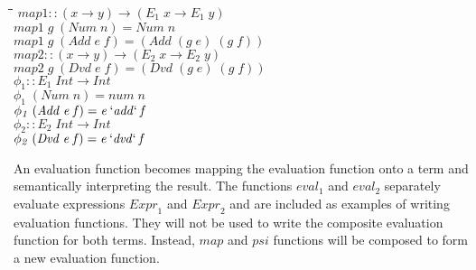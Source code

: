 \documentclass[10pt]{article}
\newlength{\lwidth}\setlength{\lwidth}{4.5cm}
\newlength{\cwidth}\setlength{\cwidth}{8mm} %
\newcommand{\Conid}[1]{\mathit{#1}}
\newcommand{\Varid}[1]{\mathit{#1}}
\begin{document}
\begin{tabbing}
\qquad\=\hspace{\lwidth}\=\hspace{\cwidth}\=\+\kill
${\Varid{map1}\mathbin{::}(\Varid{x}\to \Varid{y})\to (\Varid{E}_1\;\Varid{x}\to \Varid{E}_1\;\Varid{y})}$\\
${\Varid{map1}\;\Varid{g}\;(\Conid{Num}\;\Varid{n})\mathrel{=}\Conid{Num}\;\Varid{n}}$\\
${\Varid{map1}\;\Varid{g}\;(\Conid{Add}\;\Varid{e}\;\Varid{f})\mathrel{=}(\Conid{Add}\;(\Varid{g}\;\Varid{e})\;(\Varid{g}\;\Varid{f}))}$\\
${}$\\
${\Varid{map2}\mathbin{::}(\Varid{x}\to \Varid{y})\to (\Varid{E}_2\;\Varid{x}\to \Varid{E}_2\;\Varid{y})}$\\
${\Varid{map2}\;\Varid{g}\;(\Conid{Dvd}\;\Varid{e}\;\Varid{f})\mathrel{=}(\Conid{Dvd}\;(\Varid{g}\;\Varid{e})\;(\Varid{g}\;\Varid{f}))}$\\
${}$\\
${\Varid{\phi_1}\mathbin{::}\Varid{E}_1\;\Conid{Int}\to \Conid{Int}}$\\
${\Varid{\phi_1}\;(\Conid{Num}\;\Varid{n})\mathrel{=}\Varid{num}\;\Varid{n}}$\\
${\Varid{\phi_1}\;(\Conid{Add}\;\Varid{e}\;\Varid{f})\mathrel{=}\Varid{e}\mathbin{`\Varid{add}`}\Varid{f}}$\\
${}$\\
${\Varid{\phi_2}\mathbin{::}\Varid{E}_2\;\Conid{Int}\to \Conid{Int}}$\\
${\Varid{\phi_2}\;(\Conid{Dvd}\;\Varid{e}\;\Varid{f})\mathrel{=}\Varid{e}\mathbin{`\Varid{dvd}`}\Varid{f}}$
\end{tabbing}
An evaluation function becomes mapping the evaluation function onto a
term and semantically interpreting the result.  The functions \ensuremath{\Varid{eval}_1}
and \ensuremath{\Varid{eval}_2} separately evaluate expressions \ensuremath{\Varid{Expr}_1} and \ensuremath{\Varid{Expr}_2} and
are included as examples of writing evaluation functions. They will
not be used to write the composite evaluation function for both terms.
Instead, \ensuremath{\Varid{map}} and \ensuremath{\Varid{psi}} functions will be composed to form a new
evaluation function.
\end{document}
